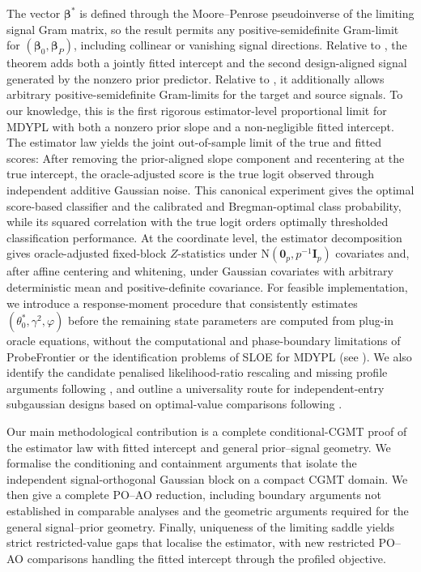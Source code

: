 \documentclass{article}
\theoremstyle{definition}
\newcommand*{\bb}{\boldsymbol}
\def\bbeta{\bb{\beta}}
\begin{document}
\begin{bibunit}
The vector $\bbeta^*$ is defined through the Moore--Penrose
pseudoinverse of the limiting signal Gram matrix, so the result permits any
positive-semidefinite Gram-limit for $(\bbeta_0,\bbeta_P)$, including
collinear or vanishing signal directions. Relative to
\citet{salehi+et+al:2019}, the theorem adds both a jointly fitted intercept
and the second design-aligned signal generated by the nonzero prior
predictor. Relative to \citet{li+huang:2024}, it additionally allows arbitrary positive-semidefinite Gram-limits for the target and source signals. To our knowledge, this is the
first rigorous estimator-level proportional limit for MDYPL with both a
nonzero prior slope and a non-negligible fitted intercept.
The estimator law yields the joint out-of-sample limit of the true and fitted
scores: After removing the prior-aligned slope component and recentering at
the true intercept, the oracle-adjusted score is the true logit observed
through independent additive Gaussian noise. This canonical experiment gives
the optimal score-based classifier and the calibrated and Bregman-optimal
class probability, while its squared correlation with the true logit orders
optimally thresholded classification performance. At the coordinate level, the estimator
decomposition gives oracle-adjusted fixed-block $Z$-statistics under $\mathrm{N}(\bb{0}_p, p^{-1}\bb I_p)$ covariates and, after affine centering and whitening, under Gaussian
covariates with arbitrary deterministic mean and positive-definite
covariance.
For feasible implementation, we introduce a response-moment procedure that
consistently estimates $(\theta_0^*,\gamma^2,\varphi)$ before the remaining
state parameters are computed from plug-in oracle equations, without the
computational and phase-boundary limitations of ProbeFrontier \citep{sur+candes:2019} or the
identification problems of SLOE \citep{yadlowsky+etal:2021} for MDYPL (see \citealt[Figure~8]{sterzinger+kosmidis:2026}).
We also identify the candidate penalised
likelihood-ratio rescaling and missing profile arguments following \citet{sur:2019}, and outline a
universality route for independent-entry subgaussian designs based on
optimal-value comparisons following \citet{montanari+saeed:2022}. 

Our main methodological contribution is a complete conditional-CGMT proof
of the estimator law with fitted intercept and general prior--signal
geometry. We formalise the conditioning and containment arguments that
isolate the independent signal-orthogonal Gaussian block on a compact CGMT
domain. We then give a complete PO--AO reduction, including boundary
arguments not established in comparable analyses and the geometric arguments
required for the general signal--prior geometry. Finally, uniqueness of the
limiting saddle yields strict restricted-value gaps that localise the
estimator, with new restricted PO--AO comparisons handling the fitted
intercept through the profiled objective.


\end{bibunit}
\end{document}
